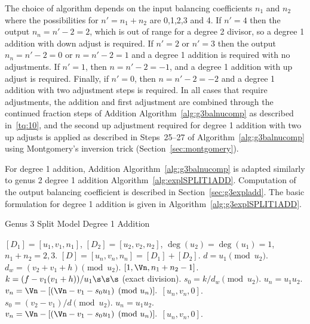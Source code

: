 The choice of algorithm depends on the input balancing coefficients $n_1$ and
$n_2$ where the possibilities for $n' =n_1 + n_2$ are 0,1,2,3 and 4. If $n' = 4$
then the output $n_n = n'-2 = 2$, which is out of range for a degree 2 divisor,
so a degree 1 addition with down adjust is required. If $n' = 2$ or $n' =3$ then
the output $n_n = n'-2 = 0$ or $n = n'-2 = 1$ and a degree 1 addition is
required with no adjustments. If $n'=1$, then $n = n' - 2= -1$, and a degree 1
addition with up adjust is required. Finally, if $n' = 0$, then $n = n' - 2 =
-2$ and a degree 1 addition with two adjustment steps is required. In all cases
that require adjustments, the addition and first adjustment are combined through
the continued fraction steps of Addition Algorithm~\ref{alg:g3balnucomp} as
described in~\ref{tq:10}, and the second up adjustment required for degree 1
addition with two up adjusts is applied as described in Steps~25--27 of
Algorithm~\ref{alg:g3balnucomp} using Montgomery's inversion trick
(Section~\ref{sec:montgomery}). 

For degree 1 addition, Addition Algorithm~\ref{alg:g3balnucomp} is adapted
similarly to genus 2 degree 1 addition Algorithm~\ref{alg:explSPLIT1ADD}.
Computation of the output balancing coefficient is described in
Section~\ref{sec:g3expladd}. The basic formulation for degree 1 addition is given
in Algorithm~\ref{alg:g3explSPLIT1ADD}.

\begin{algorithm}[H]
\caption{Genus 3 Split Model Degree 1 Addition\label{alg:g3explSPLIT1ADD}}
\begin{algorithmic} [1]
\Require $[D_1] = [u_1,v_1,n_1]$, $[D_2] = [u_2,v_2,n_2]$, $\deg(u_2) = \deg(u_1) = 1$, $n_1 + n_2 = 2,3$.
\Ensure $[D] = [u_n,v_n,n_n] = [D_1] + [D_2] $.
\algrule
\vspace{-2pt}
\State $d = u_1 \pmod{u_2}$.
    \State $d_w = (v_2 + v_1 + h) \pmod{u_2}$.
     \hspace{3pt} \Return $[1,\Vn, n_1 + n_2 - 1]$.
    \EndIf
    \State $k = (f - v_1(v_1 + h))/u_1 \s\s\s$ (exact division).  
    \State $s_0 = k/d_w \pmod{u_2}$.
    \State $u_n = u_1u_2$.
    \State $v_n = \Vn - [(\Vn - v_1 - s_0u_1) \pmod{u_n}].$ 
    \State \Return $[u_n,v_n,0]$.
\EndIf
\State $s_0 = (v_2 - v_1)/d \pmod{u_2}$.
\State $u_n = u_1u_2$.
\State $v_n = \Vn - [(\Vn - v_1 - s_0u_1) \pmod{u_n}].$ 
\State \Return $[u_n,v_n,0]$.
\vspace{-2pt}
\end{algorithmic}
\end{algorithm}

